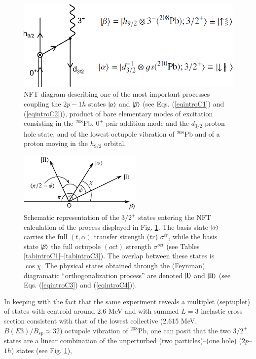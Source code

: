 \begin{figure}
\centerline {
\includegraphics*[width=12cm]{introduccion/figs/figintroC1}
}
\caption{NFT diagram describing one of the most important processes coupling the $2p-1h$ states $|{\alpha} \rangle$ and $|{\beta} \rangle$ (see Eqs. (\ref{eqintroC1}) and (\ref{eqintroC2})), product of bare elementary modes of excitation consisting in the $^{208}$Pb, $0^+$ pair addition mode and the $d_{3/2}$ proton hole state, and of the lowest octupole vibration of $^{208}$Pb and of a proton moving in the $h_{9/2}$ orbital.}
\label{figintroC1}
\end{figure}
\begin{figure}
\centerline {
\includegraphics*[width=6cm]{introduccion/figs/figintroC2}}
\caption{Schematic representation of the $3/2^+$ states entering the NFT calculation of the process displayed in Fig. \ref{figintroC1}. The basis state $|{\alpha} \rangle$ carries the full $(t,\alpha)$ transfer strength ($tr$) $\sigma^{tr}$, while the basis state $|{\beta} \rangle$ the full octupole $(oct)$ strength $\sigma^{oct}$ (see Tables \ref{tabintroC1}--\ref{tabintroC3}). The overlap between these states is  $\cos \chi$. The physical states obtained through the (Feynman) diagramatic ``orthogonalization process'' are denoted $|{\text{I}} \rangle$ and $|{\text{II}} \rangle$ (see Eqs. (\ref{eqintroC3}) and (\ref{eqintroC4})).}
\label{figintroC2}
\end{figure}
In keeping with the fact that the same experiment reveals a multiplet (septuplet) of states with centroid around 2.6 MeV and with summed $L=3$ inelastic cross section consistent with that of the lowest collective  (2.615 MeV, $B(E3)/B_{sp}\approx 32$) octupole vibration of $^{208}$Pb, one can posit that the two $3/2^+$ states are a linear combination of the unperturbed (two particles)--(one hole) ($2p$--$1h$) states (see Fig. \ref{figintroC1}),
